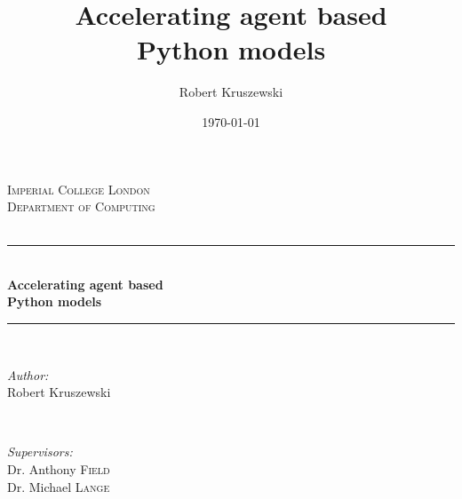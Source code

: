 \documentclass[12pt, a4paper]{report}
\title{Accelerating agent based\\Python models}
\date{\today}
\author{Robert Kruszewski}
\begin{document}
\begin{titlepage}

\newcommand{\HRule}{\rule{\linewidth}{0.5mm}} %

\center %


\textsc{\large Imperial College London}\\[1.5cm] %
\textsc{\large Department of Computing}\\[0.5cm] %
\textsc{\large}\\[0.5cm] %


\HRule \\[0.4cm]
{ \huge \bfseries Accelerating agent based\\\vspace{0.4cm}Python models}\\[0.4cm] %
\HRule \\[1.5cm]


\begin{minipage}{0.4\textwidth}
\begin{flushleft} \large
\emph{Author:}\\
Robert Kruszewski\\
\end{flushleft}
\end{minipage}
~
\begin{minipage}{0.4\textwidth}
\begin{flushright} \large
\emph{Supervisors:} \\
Dr. Anthony \textsc{Field} \\%
Dr. Michael \textsc{Lange} \\%
\end{flushright}
\end{minipage}\\[5cm]


\end{titlepage}
\end{document}
